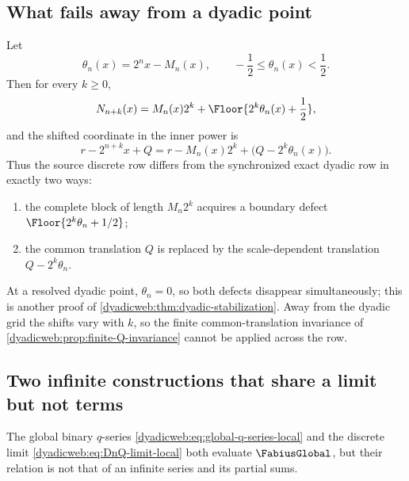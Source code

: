 \documentclass[11pt,oneside]{article}
\theoremstyle{definition}
\theoremstyle{remark}
\begin{document}
\subsection{What fails away from a dyadic point}

Let
\begin{equation}
 \theta_n(x)=2^nx-M_n(x),
 \qquad -\frac12\le\theta_n(x)<\frac12.                  \label{dyadicweb:eq:theta-n}
\end{equation}
Then for every $k\ge0$,
\begin{equation}
 N_{n+k}(x)
 =M_n(x)2^k+\Floor{2^k\theta_n(x)+\frac12}, \label{dyadicweb:eq:cutoff-defect}
\end{equation}
and the shifted coordinate in the inner power is
\begin{equation}
 r-2^{n+k}x+Q
 =r-M_n(x)2^k+\bigl(Q-2^k\theta_n(x)\bigr).               \label{dyadicweb:eq:shift-defect}
\end{equation}
Thus the source discrete row differs from the synchronized exact dyadic row in exactly two
ways:
\begin{enumerate}
\item the complete block of length $M_n2^k$ acquires a boundary defect
      $\Floor{2^k\theta_n+1/2}$;
\item the common translation $Q$ is replaced by the scale-dependent translation
      $Q-2^k\theta_n$.
\end{enumerate}
At a resolved dyadic point, $\theta_n=0$, so both defects disappear simultaneously; this is
another proof of \cref{dyadicweb:thm:dyadic-stabilization}.  Away from the dyadic grid the shifts vary
with $k$, so the finite common-translation invariance of
\cref{dyadicweb:prop:finite-Q-invariance} cannot be applied across the row.

\subsection{Two infinite constructions that share a limit but not terms}

The global binary $q$-series \eqref{dyadicweb:eq:global-q-series-local} and the discrete limit
\eqref{dyadicweb:eq:DnQ-limit-local} both evaluate $\FabiusGlobal$, but their relation is not that of an
infinite series and its partial sums.
\end{document}
